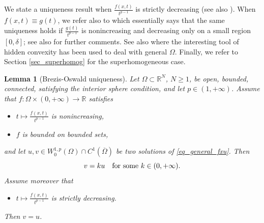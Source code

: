 \documentclass[11pt, reqno]{amsart}
\newtheorem{lemma}{Lemma}[section]
\theoremstyle{definition}
\numberwithin{equation}{section}
\newcommand{\R}{\mathbb{R}}
\begin{document}
We state a uniqueness result when $ \frac{f(x, t)}{t^{p-1}}$ is strictly decreasing (see also \cite[Theorem 2.1]{GuVe89}). 
When $f(x,t) \equiv g(t)$, we refer also to \cite[Proposition 3.8]{BMS22} which essentially says that the same uniqueness holds if $ \frac{g(t)}{t^{p-1}}$ is nonincreasing and decreasing only on a small region $[0,\delta]$; see also \cite{Mos23} for further comments. See also \cite{BeKa02, KaLi06} where the interesting tool of hidden convexity has been used to deal with general $\Omega$. 
Finally, we refer to Section \ref{sec_superhomog} for the superhomogeneous case.

\begin{lemma}[Brezis-Oswald uniqueness]
\label{lem_uniquen}
Let $\Omega \subset \R^N$, $N \geq 1$, be open, bounded, connected, satisfying the interior sphere condition, and let $p \in (1,+\infty)$. 
Assume that $f: \Omega \times (0,+\infty) \to \R$ satisfies
\begin{itemize}
\item $t \mapsto \frac{f(x, t)}{t^{p-1}}$ is nonincreasing, 
\item $f$ is bounded on bounded sets,
\end{itemize}
and let $u,v \in W^{1,p}_0(\Omega) \cap C^1(\overline{\Omega})$ be two solutions of
\eqref{eq_general_fxu}. 
Then
$$v = k u \quad \hbox{for some $k \in (0,+\infty)$}.$$
Assume moreover that
\begin{itemize}
\item $t \mapsto \frac{f(x, t)}{t^{p-1}}$ is strictly decreasing.
\end{itemize}
Then $v=u$. 
\end{lemma}
\end{document}
